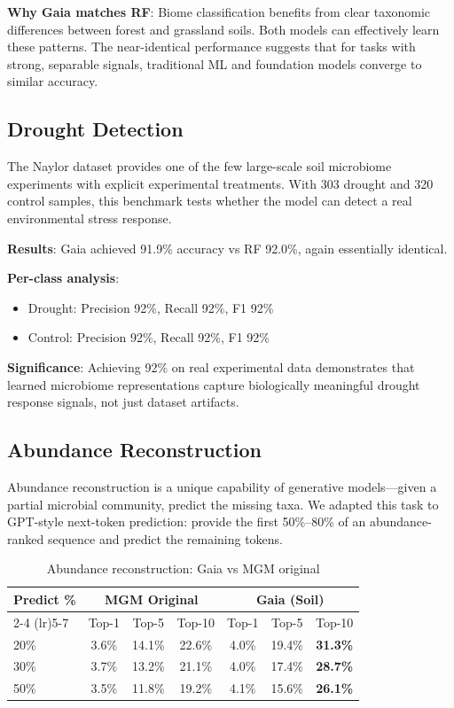 \documentclass[11pt,a4paper]{article}
\begin{document}
\textbf{Why Gaia matches RF}: Biome classification benefits from clear taxonomic differences between forest and grassland soils. Both models can effectively learn these patterns. The near-identical performance suggests that for tasks with strong, separable signals, traditional ML and foundation models converge to similar accuracy.

\subsection{Drought Detection}

The Naylor dataset provides one of the few large-scale soil microbiome experiments with explicit experimental treatments. With 303 drought and 320 control samples, this benchmark tests whether the model can detect a real environmental stress response.

\textbf{Results}: Gaia achieved 91.9\% accuracy vs RF 92.0\%, again essentially identical.

\textbf{Per-class analysis}:
\begin{itemize}[leftmargin=1.5em]
    \item Drought: Precision 92\%, Recall 92\%, F1 92\%
    \item Control: Precision 92\%, Recall 92\%, F1 92\%
\end{itemize}

\textbf{Significance}: Achieving 92\% on real experimental data demonstrates that learned microbiome representations capture biologically meaningful drought response signals, not just dataset artifacts.

\subsection{Abundance Reconstruction}

Abundance reconstruction is a unique capability of generative models---given a partial microbial community, predict the missing taxa. We adapted this task to GPT-style next-token prediction: provide the first 50\%--80\% of an abundance-ranked sequence and predict the remaining tokens.

\begin{table}[H]
\centering
\caption{Abundance reconstruction: Gaia vs MGM original}
\label{tab:reconstruction}
\begin{tabular}{lcccccc}
\toprule
\multirow{2}{*}{\textbf{Predict \%}} & \multicolumn{3}{c}{\textbf{MGM Original}} & \multicolumn{3}{c}{\textbf{Gaia (Soil)}} \\
\cmidrule(lr){2-4} \cmidrule(lr){5-7}
 & Top-1 & Top-5 & Top-10 & Top-1 & Top-5 & Top-10 \\
\midrule
20\% & 3.6\% & 14.1\% & 22.6\% & 4.0\% & 19.4\% & \textbf{31.3\%} \\
30\% & 3.7\% & 13.2\% & 21.1\% & 4.0\% & 17.4\% & \textbf{28.7\%} \\
50\% & 3.5\% & 11.8\% & 19.2\% & 4.1\% & 15.6\% & \textbf{26.1\%} \\
\bottomrule
\end{tabular}
\end{table}
\end{document}
